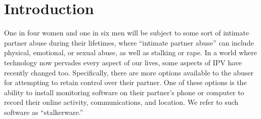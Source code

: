 \documentclass[acmtog]{acmart}
\begin{document}
\maketitle

\section{Introduction}
One in four women and one in six men will be subject to some sort of intimate 
partner abuse during their lifetimes, where ``intimate partner abuse'' can 
include physical, emotional, or sexual abuse, as well as stalking or rape. In a 
world where technology now pervades every aspect of our lives, some 
aspects of IPV have recently changed too. Specifically, there are more options 
available to the abuser for attempting to retain control over their partner. 
One of these options is the ability to install monitoring software on their 
partner's phone or computer to record their online activity, communications, 
and location. We refer to such software as ``stalkerware.''  
\end{document}
